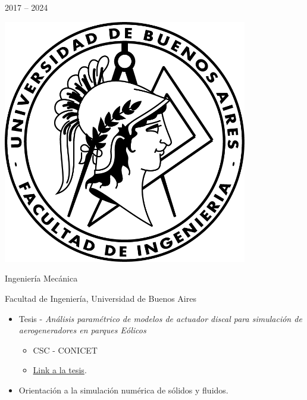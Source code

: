 \documentclass[a4paper,10pt]{article}
\newlength{\cvcolumngapwidth}
\newlength{\cvleftcolumnwidth}
\newlength{\cvrightcolumnwidth}
\newcommand{\cvtitlestyle}[1]{{\large\cvtitlefont\textcolor{cvtitlecolor}{#1}}}
\newcommand{\cvdurationstyle}[1]{{\small\cvdurationfont\textcolor{cvdurationcolor}{#1}}}
\newlength{\cvafteritemskipamount}
\newlength{\cvaftertitleskipamount}
\newlength{\cvparskip}
\newcommand{\cvitem}[2]{
    \begin{minipage}[t]{\cvleftcolumnwidth}
        \raggedleft #1
    \end{minipage}%
    \hspace{\cvcolumngapwidth}%
    \begin{minipage}[t]{\cvrightcolumnwidth}
        \setlength{\parskip}{\cvparskip} #2
    \end{minipage}

    \vspace{\cvafteritemskipamount}
}
\newcommand{\cvtitle}[1]{
    \cvtitlestyle{#1}

    \vspace{\cvaftertitleskipamount}
    \vspace{-\cvparskip}
}
\begin{document}
\cvitem{
    \cvdurationstyle{2017 -- 2024}
}{
    \begin{minipage}{0.1\textwidth}
        \centering
        \includegraphics[width=0.8\textwidth]{../logos-photos/Logo_FIUBA.png}   
    \end{minipage}      
    \cvtitle{Ingeniería Mecánica}

    Facultad de Ingeniería, Universidad de Buenos Aires
    
    \begin{itemize}[leftmargin=*]
        \item Tesis - \textit{Análisis paramétrico de modelos de actuador discal para simulación de aerogeneradores en parques Eólicos}
            \begin{itemize}
                \item CSC - CONICET
                \item \href{https://drive.google.com/file/d/1TWklGPKCdaIwJHuOc-fqAFvFS9hN7_sT/view?usp=sharing}{Link a
                la tesis}.
            \end{itemize}
        \item Orientación a la simulación numérica de sólidos y fluidos.
    \end{itemize}
}
\end{document}
